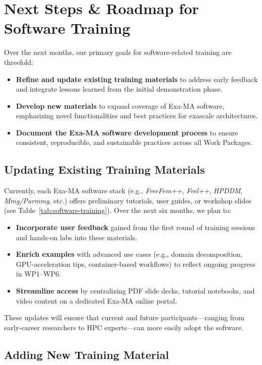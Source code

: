 \section{Next Steps \& Roadmap for Software Training}
\label{sec:next-steps-software}

Over the next months, our primary goals for software-related training are threefold: 
\begin{itemize}
    \item \textbf{Refine and update existing training materials} to address early feedback and integrate lessons learned from the initial demonstration phase.
    \item \textbf{Develop new materials} to expand coverage of Exa-MA software, emphasizing novel functionalities and best practices for exascale architectures.
    \item \textbf{Document the Exa-MA software development process} to ensure consistent, reproducible, and sustainable practices across all Work Packages.
\end{itemize}

\subsection{Updating Existing Training Materials}

Currently, each Exa-MA software stack (e.g., \textit{FreeFem++}, \textit{Feel++}, \textit{HPDDM}, \textit{Mmg/Parmmg}, etc.) offers preliminary tutorials, user guides, or workshop slides (see Table~\ref{tab:software-training}). 
%
Over the next six months, we plan to:
\begin{itemize}
    \item \textbf{Incorporate user feedback} gained from the first round of training sessions and hands-on labs into these materials. 
    \item \textbf{Enrich examples} with advanced use cases (e.g., domain decomposition, GPU-acceleration tips, container-based workflows) to reflect ongoing progress in WP1--WP6.
    \item \textbf{Streamline access} by centralizing PDF slide decks, tutorial notebooks, and video content on a dedicated Exa-MA online portal.
\end{itemize}
These updates will ensure that current and future participants—ranging from early-career researchers to HPC experts—can more easily adopt the software.

\subsection{Adding New Training Material}

